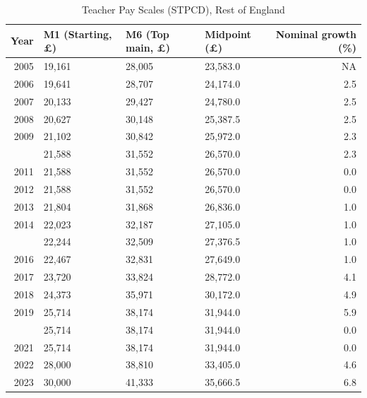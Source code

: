 \begin{table}[!h]
\centering
\caption{\label{tab:tab:stpcd}Teacher Pay Scales (STPCD), Rest of England}
\centering
\begin{tabular}[t]{rlllr}
\toprule
Year & M1 (Starting, £) & M6 (Top main, £) & Midpoint (£) & Nominal growth (\%)\\
\midrule
2005 & 19,161 & 28,005 & 23,583.0 & NA\\
2006 & 19,641 & 28,707 & 24,174.0 & 2.5\\
2007 & 20,133 & 29,427 & 24,780.0 & 2.5\\
2008 & 20,627 & 30,148 & 25,387.5 & 2.5\\
2009 & 21,102 & 30,842 & 25,972.0 & 2.3\\
\addlinespace
2010 & 21,588 & 31,552 & 26,570.0 & 2.3\\
2011 & 21,588 & 31,552 & 26,570.0 & 0.0\\
2012 & 21,588 & 31,552 & 26,570.0 & 0.0\\
2013 & 21,804 & 31,868 & 26,836.0 & 1.0\\
2014 & 22,023 & 32,187 & 27,105.0 & 1.0\\
\addlinespace
2015 & 22,244 & 32,509 & 27,376.5 & 1.0\\
2016 & 22,467 & 32,831 & 27,649.0 & 1.0\\
2017 & 23,720 & 33,824 & 28,772.0 & 4.1\\
2018 & 24,373 & 35,971 & 30,172.0 & 4.9\\
2019 & 25,714 & 38,174 & 31,944.0 & 5.9\\
\addlinespace
2020 & 25,714 & 38,174 & 31,944.0 & 0.0\\
2021 & 25,714 & 38,174 & 31,944.0 & 0.0\\
2022 & 28,000 & 38,810 & 33,405.0 & 4.6\\
2023 & 30,000 & 41,333 & 35,666.5 & 6.8\\
\bottomrule
\end{tabular}
\end{table}
